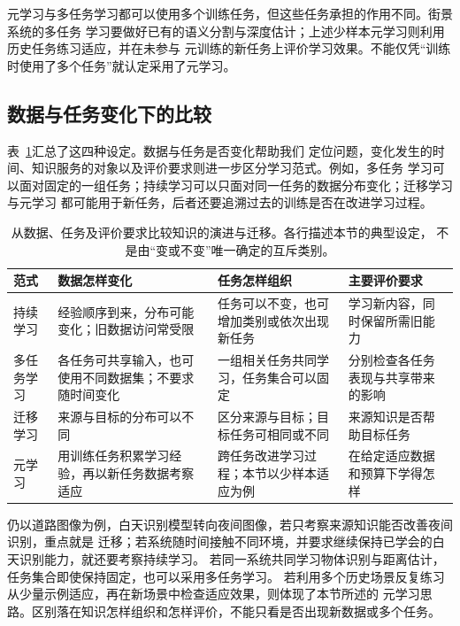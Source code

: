 元学习与多任务学习都可以使用多个训练任务，但这些任务承担的作用不同。街景系统的多任务
学习要做好已有的语义分割与深度估计；上述少样本元学习则利用历史任务练习适应，并在未参与
元训练的新任务上评价学习效果。不能仅凭“训练时使用了多个任务”就认定采用了元学习。

\FloatBarrier
\subsection{数据与任务变化下的比较}
\label{sec:knowledge-evolution-comparison}

表~\ref{tab:knowledge-evolution-comparison}汇总了这四种设定。数据与任务是否变化帮助我们
定位问题，变化发生的时间、知识服务的对象以及评价要求则进一步区分学习范式。例如，多任务
学习可以面对固定的一组任务；持续学习可以只面对同一任务的数据分布变化；迁移学习与元学习
都可能用于新任务，后者还要追溯过去的训练是否在改进学习过程。

\begin{table}[htbp]
  \centering
  \small
  \begin{tabularx}{\linewidth}{@{}lXXX@{}}
    \toprule
    \textbf{范式} & \textbf{数据怎样变化} & \textbf{任务怎样组织} & \textbf{主要评价要求} \\
    \midrule
    持续学习 & 经验顺序到来，分布可能变化；旧数据访问常受限 & 任务可以不变，也可增加类别或依次出现新任务 & 学习新内容，同时保留所需旧能力 \\
    多任务学习 & 各任务可共享输入，也可使用不同数据集；不要求随时间变化 & 一组相关任务共同学习，任务集合可以固定 & 分别检查各任务表现与共享带来的影响 \\
    迁移学习 & 来源与目标的分布可以不同 & 区分来源与目标；目标任务可相同或不同 & 来源知识是否帮助目标任务 \\
    元学习 & 用训练任务积累学习经验，再以新任务数据考察适应 & 跨任务改进学习过程；本节以少样本适应为例 & 在给定适应数据和预算下学得怎样 \\
    \bottomrule
  \end{tabularx}
  \caption{从数据、任务及评价要求比较知识的演进与迁移。各行描述本节的典型设定，
  不是由“变或不变”唯一确定的互斥类别。}
  \label{tab:knowledge-evolution-comparison}
\end{table}
\FloatBarrier

仍以道路图像为例，白天识别模型转向夜间图像，若只考察来源知识能否改善夜间识别，重点就是
迁移；若系统随时间接触不同环境，并要求继续保持已学会的白天识别能力，就还要考察持续学习。
若同一系统共同学习物体识别与距离估计，任务集合即使保持固定，也可以采用多任务学习。
若利用多个历史场景反复练习从少量示例适应，再在新场景中检查适应效果，则体现了本节所述的
元学习思路。区别落在知识怎样组织和怎样评价，不能只看是否出现新数据或多个任务。

